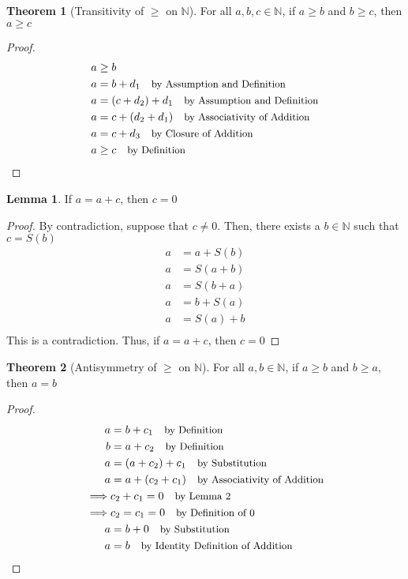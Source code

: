 \documentclass[12pt]{article}
\newcommand{\stext}[1]{\quad\text{\small #1}}
\theoremstyle{definition}
\newtheorem{theorem}{Theorem}
\newtheorem{lemma}{Lemma}
\begin{document}
\begin{theorem}[Transitivity of $\geq$ on $\mathbb{N}$]
    For all $a, b, c \in \mathbb{N}$, if $a \geq b$ and $b \geq c$, then $a \geq c$
\end{theorem}
\begin{proof}
    \begin{align*}
        & a \geq b \\
        & a = b + d_1 \stext{by Assumption and Definition}\\ 
        & a = (c + d_2) + d_1 \stext{by Assumption and Definition}\\
        & a = c + (d_2 + d_1) \stext{by Associativity of Addition}\\
        & a = c + d_3 \stext{by Closure of Addition}\\ 
        & a \geq c \stext{by Definition}
    \end{align*}
\end{proof}

\begin{lemma}
    If $a = a + c$, then $c = 0$
\end{lemma}
\begin{proof} By contradiction, suppose that $c \neq 0$. Then, there exists a $b \in \mathbb{N}$ such that $c = S(b)$
    \begin{align*}
        a &= a + S(b) \\ 
        a &= S(a + b) \\
        a &= S(b + a) \\ 
        a &= b + S(a) \\ 
        a &= S(a) + b \\
    \end{align*}
    This is a contradiction. Thus, if $a = a + c$, then $c = 0$
\end{proof}

\begin{theorem}[Antisymmetry of $\geq$ on $\mathbb{N}$]
    For all $a, b \in \mathbb{N}$, if $a \geq b$ and $b \geq a$, then $a = b$
\end{theorem}
\begin{proof}
    \begin{align*}
        a &= b + c_1 \stext{by Definition}\\
        b &= a + c_2 \stext{by Definition}\\ 
        a &= (a + c_2) + c_1 \stext{by Substitution}\\ 
        a &= a + (c_2 + c_1) \stext{by Associativity of Addition}\\
        \implies & c_2 + c_1 = 0 \stext{by Lemma 2}\\
        \implies & c_2 = c_1 = 0 \stext{by Definition of 0}\\ 
        a &= b + 0  \stext{by Substitution}\\
        a &= b \stext{by Identity Definition of Addition}
    \end{align*}
\end{proof}
\end{document}
